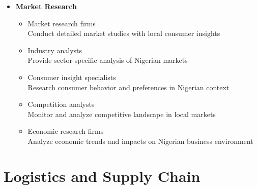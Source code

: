 \begin{tcolorbox}[
    colback=white,
    colframe=primarydark,
    title=\textbf{Business Support Providers},
    before skip=1em,
    after skip=1em
]
\begin{itemize}[leftmargin=*,itemsep=0.5em]
        \vspace{0.5em}

        \item \textbf{Market Research}
        \begin{itemize}[itemsep=0.3em]
            \item Market research firms \\
                \small{Conduct detailed market studies with local consumer insights}
            \item Industry analysts \\
                \small{Provide sector-specific analysis of Nigerian markets}
            \item Consumer insight specialists \\
                \small{Research consumer behavior and preferences in Nigerian context}
            \item Competition analysts \\
                \small{Monitor and analyze competitive landscape in local markets}
            \item Economic research firms \\
                \small{Analyze economic trends and impacts on Nigerian business environment}
        \end{itemize}
    \end{itemize}
\end{tcolorbox}

\section{Logistics and Supply Chain}\label{sec:logistics-supply-chain}
\vspace{1em}

